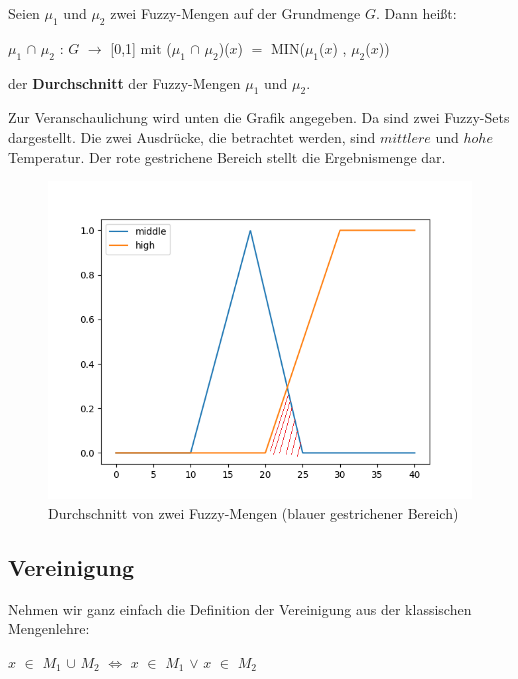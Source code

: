 \begin{definition}
	Seien $\mu_1$ und $\mu_2$ zwei Fuzzy-Mengen auf der Grundmenge $G$. Dann heißt:
		\begin{center}
			$\mu_1$ $\cap$ $\mu_2$ : $G$ $\rightarrow$ [0,1] $\text{mit}$ ($\mu_1$ $\cap$ $\mu_2$)($x$) $=$ MIN($\mu_1$($x$) , $\mu_2$($x$)) 
		\end{center}
	der \textbf{Durchschnitt} der Fuzzy-Mengen $\mu_1$ und $\mu_2$.
\end{definition} 

Zur Veranschaulichung wird unten die Grafik angegeben. Da sind zwei Fuzzy-Sets dargestellt. Die zwei Ausdrücke, die betrachtet werden, sind $mittlere$ und $hohe$ Temperatur. Der rote gestrichene Bereich stellt die Ergebnismenge dar.

\begin{figure}[htbp]
	\centering
	\includegraphics[scale=0.5]{images/und_high_middle_temp.png}
	\caption{Durchschnitt von zwei Fuzzy-Mengen (blauer gestrichener Bereich)}\label{high_low_temp_intersection}
\end{figure}



\subsection{Vereinigung}

Nehmen wir ganz einfach die Definition der Vereinigung aus der klassischen Mengenlehre:
	\begin{center}
	$x$  $\in$ $M_1$ $\cup$ $M_2$ $\Leftrightarrow$ $x$ $\in$ $M_1$ $\vee$ $x$ $\in$ $M_2$
	\end{center}


